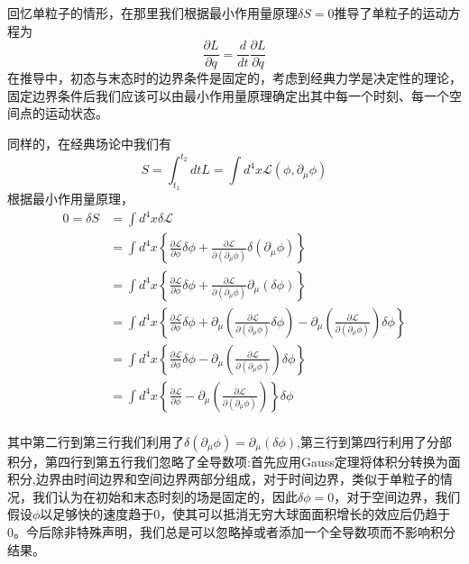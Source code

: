 回忆单粒子的情形，在那里我们根据最小作用量原理$\delta S=0$推导了单粒子的运动方程为
\begin{equation}
    \frac{\partial L}{\partial q}=\frac{d}{dt}\frac{\partial L}{\partial \dot{q}}
\end{equation}
在推导中，初态与末态时的边界条件是固定的，考虑到经典力学是决定性的理论，固定边界条件后我们应该可以由最小作用量原理确定出其中每一个时刻、每一个空间点的运动状态。

同样的，在经典场论中我们有
\begin{equation}
    S=\int_{t_{1}}^{t_{2}} dtL=\int d^{4}x \mathcal{L}(\phi,\partial_{\mu}\phi)
\end{equation}
根据最小作用量原理，
\begin{equation}
\begin{aligned}
    0=\delta S &=\int d^{4}x \delta \mathcal{L} \\
    &=\int d^{4}x \left\{\frac{\partial \mathcal{L}}{\partial \phi} \delta \phi+\frac{\partial \mathcal{L}}{\partial (\partial_{\mu}\phi)} \delta \left(\partial_{\mu}\phi\right) \right\} \\
    &=\int d^{4}x \left\{\frac{\partial \mathcal{L}}{\partial \phi} \delta \phi+\frac{\partial \mathcal{L}}{\partial (\partial_{\mu}\phi)} \partial_{\mu} \left(\delta \phi\right) \right\} \\
    &=\int d^{4}x \left\{\frac{\partial \mathcal{L}}{\partial \phi} \delta \phi+\partial_{\mu}\left(\frac{\partial \mathcal{L}}{\partial (\partial_{\mu}\phi)} \delta \phi \right)-\partial_{\mu}\left(\frac{\partial \mathcal{L}}{\partial (\partial_{\mu}\phi)}\right) \delta \phi\right\} \\
    &=\int d^{4}x \left\{\frac{\partial \mathcal{L}}{\partial \phi} \delta \phi-\partial_{\mu}\left(\frac{\partial \mathcal{L}}{\partial (\partial_{\mu}\phi)}\right) \delta \phi\right\} \\
     &=\int d^{4}x \left\{\frac{\partial \mathcal{L}}{\partial \phi} -\partial_{\mu}\left(\frac{\partial \mathcal{L}}{\partial (\partial_{\mu}\phi)}\right) \right\}\delta \phi \\
    \end{aligned}
\end{equation}

其中第二行到第三行我们利用了$\delta(\partial_{\mu}\phi)=\partial_{\mu}(\delta \phi)$,第三行到第四行利用了分部积分，第四行到第五行我们忽略了全导数项:首先应用Gauss定理将体积分转换为面积分,边界由时间边界和空间边界两部分组成，对于时间边界，类似于单粒子的情况，我们认为在初始和末态时刻的场是固定的，因此$\delta \phi=0$，对于空间边界，我们假设$\phi$以足够快的速度趋于0，使其可以抵消无穷大球面面积增长的效应后仍趋于0。今后除非特殊声明，我们总是可以忽略掉或者添加一个全导数项而不影响积分结果。

